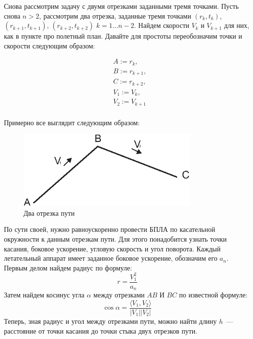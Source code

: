 \documentclass[a4paper,12pt]{article}
\begin{document}
Снова рассмотрим задачу с двумя отрезками заданными тремя точками. Пусть снова $n>2$, рассмотрим два отрезка, заданные тремя точками $(r_k,t_k)$, $(r_{k+1},t_{k+1})$, $(r_{k+2},t_{k+2})$ $k=1\dots n-2$. Найдем скорости $V_k$ и $V_{k+1}$ для них, как в пункте про полетный план. Давайте для простоты переобозначим точки и скорости следующим образом:

\begin{align*}
    &A:=r_k, \\
    &B:=r_{k+1},\\ 
    &C:=r_{k+2},\\
    &V_1 := V_k, \\
    &V_2:= V_{k+1}\\
\end{align*}

Примерно все выглядит следующим образом:

\begin{figure}[ht!]
\centering
\includegraphics[width=90mm]{3point.eps}
\caption{Два отрезка пути}\label{two_lines}
\end{figure}

По сути своей, нужно равноускоренно провести БПЛА по касательной окружности к данным отрезкам пути. Для этого понадобится узнать точки касания, боковое ускорение, угловую скорость и угол поворота. Каждый летательный аппарат имеет заданное боковое ускорение, обозначим его $a_n$.
Первым делом найдем радиус  по формуле: 
$$r = \frac{V_1^2}{a_n}$$
Затем найдем косинус угла $\alpha$ между отрезками $AB$ И $BC$ по известной формуле:
$$\cos{\alpha} = \frac{\langle V_1,V_2 \rangle}{|V_1||V_2|}$$
Теперь, зная радиус и угол между отрезками пути, можно найти длину $h$~--- расстояние от точки касания до точки стыка двух отрезков пути.
\end{document}
